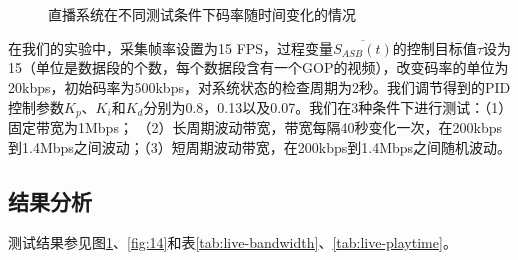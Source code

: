 \begin{figure}[!t]
	\centering
	 \\
	 \\
	\caption{直播系统在不同测试条件下码率随时间变化的情况}
	\label{fig:09}
\end{figure}

在我们的实验中，采集帧率设置为15 FPS，过程变量$\overline{S_{ASB}(t)}$的控制目标值$\tau$设为15（单位是数据段的个数，每个数据段含有一个GOP的视频），改变码率的单位为20kbps，初始码率为500kbps，对系统状态的检查周期为2秒。我们调节得到的PID控制参数$K_p$、$K_i$和$K_d$分别为0.8，0.13以及0.07。我们在3种条件下进行测试：（1）固定带宽为1Mbps；
（2）长周期波动带宽，带宽每隔40秒变化一次，在200kbps到1.4Mbps之间波动；（3）短周期波动带宽，在200kbps到1.4Mbps之间随机波动。

\subsection{结果分析}

测试结果参见图\ref{fig:09}、\ref{fig:14}和表\ref{tab:live-bandwidth}、\ref{tab:live-playtime}。

